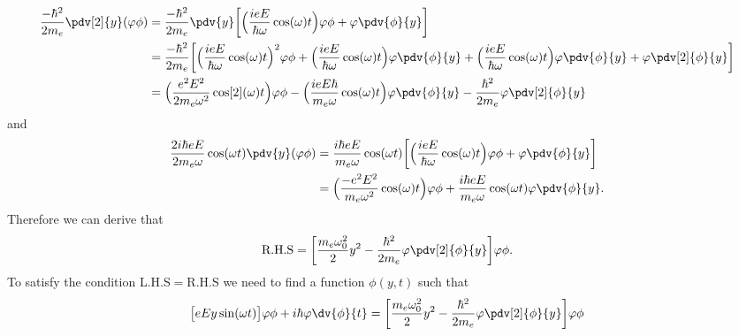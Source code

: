 \begin{equation} \label{1.25}
  \begin{aligned}
    \frac{-\hbar^2}{2m_e}\pdv[2]{y}(\varphi\phi) & =
    \frac{-\hbar^2}{2m_e} \pdv{y}\bigg[
      \Big(\frac{ieE}{\hbar \omega} \cos(\omega)t\Big)\varphi\phi +
      \varphi\pdv{\phi}{y}
    \bigg] \\
    & =
    \frac{-\hbar^2}{2m_e} \bigg[
      \Big(\frac{ieE}{\hbar \omega} \cos(\omega)t\Big)^2\varphi\phi +
      \Big(\frac{ieE}{\hbar \omega} \cos(\omega)t\Big)\varphi\pdv{\phi}{y} +
      \Big(\frac{ieE}{\hbar \omega} \cos(\omega)t\Big)\varphi\pdv{\phi}{y} +
      \varphi\pdv[2]{\phi}{y}
    \bigg] \\
    & =
    \Big(\frac{e^2E^2}{ 2m_e\omega^2} \cos[2](\omega)t\Big)\varphi\phi -
    \Big(\frac{ieE \hbar}{m_e\omega} \cos(\omega)t\Big)\varphi\pdv{\phi}{y} -
    \frac{\hbar^2}{2m_e}
    \varphi\pdv[2]{\phi}{y}
  \end{aligned}
\end{equation}
and
\begin{equation} \label{1.26}
  \begin{aligned}
    \frac{2i\hbar eE}{2m_e\omega}\cos(\omega t) \pdv{y} (\varphi\phi)& =
    \frac{i\hbar eE}{m_e\omega}\cos(\omega t)
    \bigg[
      \Big(\frac{ieE}{\hbar \omega} \cos(\omega)t\Big)\varphi\phi +
      \varphi\pdv{\phi}{y}
    \bigg] \\
    & =
    \Big(\frac{-e^2E^2}{m_e\omega^2} \cos(\omega)t\Big)\varphi\phi +
    \frac{i\hbar eE}{m_e\omega}\cos(\omega t)\varphi\pdv{\phi}{y}.
  \end{aligned}
\end{equation}
Therefore we can derive that
\begin{equation} \label{1.27}
  \begin{aligned}
    \text{R.H.S} =
    \bigg[
    \frac{m_e \omega_0^2}{2}y^2
    -
    \frac{\hbar^2}{2m_e}
    \varphi\pdv[2]{\phi}{y} \bigg]
    \varphi\phi.
  \end{aligned}
\end{equation}
To satisfy the condition L.H.S$=$R.H.S we need to find a function $\phi(y,t)$ such that
\begin{equation} \label{1.28}
  \begin{aligned}
    \big[{eEy}\sin(\omega t)\big]\varphi\phi +
    i \hbar\varphi  \dv{\phi}{t}
    =
    \bigg[
    \frac{m_e \omega_0^2}{2}y^2
    -
    \frac{\hbar^2}{2m_e}
    \varphi\pdv[2]{\phi}{y} \bigg]
    \varphi\phi
  \end{aligned}
\end{equation}
